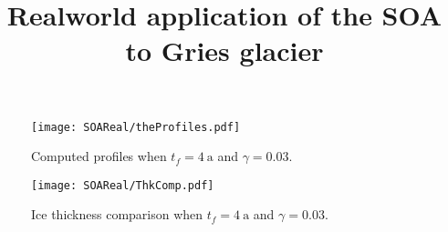 \documentclass[a4paper, 12pt]{article}
\title{Realworld application of the SOA to Gries glacier}
\begin{document}
\maketitle
\begin{figure}
\centering
\texttt{[image: SOAReal/theProfiles.pdf]}
\caption{Computed profiles when $t_f=4~\mathrm{a}$ and $\gamma=0.03$.}
\end{figure}

\begin{figure}
\centering
\texttt{[image: SOAReal/ThkComp.pdf]}
\caption{Ice thickness comparison when $t_f=4~\mathrm{a}$ and $\gamma=0.03$.}
\end{figure}
\end{document}
